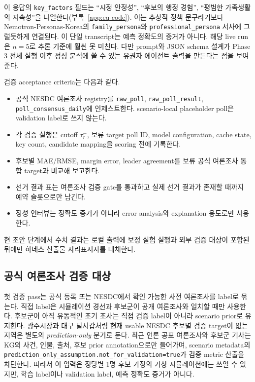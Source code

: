 \documentclass[11pt]{article}
\begin{document}
\noindent 이 응답의 \texttt{key\_factors} 필드는 ``시정 안정성'', ``후보의 행정 경험'', ``평범한 가족생활의 지속성''을 나열한다(부록~\ref{app:eq-code}). 이는 추상적 정책 문구라기보다 Nemotron-Personas-Korea의 \texttt{family\_persona}와 \texttt{professional\_persona} 서사에 그럴듯하게 연결된다. 이 단일 transcript는 예측 정확도의 증거가 아니다. 해당 live run은 $n{=}5$로 추론 기준에 훨씬 못 미친다. 다만 prompt와 JSON schema 설계가 Phase 3 전체 실행 이후 정성 분석에 쓸 수 있는 유권자 에이전트 출력을 만든다는 점을 보여준다.

검증 acceptance criteria는 다음과 같다.

\begin{itemize}
  \item 공식 NESDC 여론조사 registry를 \texttt{raw\_poll}, \texttt{raw\_poll\_result}, \texttt{poll\_consensus\_daily}에 인제스트한다. scenario-local placeholder poll은 validation label로 쓰지 않는다.
  \item 각 검증 실행은 cutoff $\tau_r^-$, 보류 target poll ID, model configuration, cache state, key count, candidate mapping을 scoring 전에 기록한다.
  \item 후보별 MAE/RMSE, margin error, leader agreement를 보류 공식 여론조사 통합 target과 비교해 보고한다.
  \item 선거 결과 표는 여론조사 검증 gate를 통과하고 실제 선거 결과가 존재할 때까지 예약 슬롯으로만 남긴다.
  \item 정성 인터뷰는 정확도 증거가 아니라 error analysis와 explanation 용도로만 사용한다.
\end{itemize}

현 초안 단계에서 수치 결과는 로컬 출력에 보정 실험 실행과 외부 검증 대상이 포함된 뒤에만 하네스 산출물 자리표시자를 대체한다.

\subsection{공식 여론조사 검증 대상}

첫 검증 pass는 공식 등록 또는 NESDC에서 확인 가능한 사전 여론조사를 label로 묶는다. 직접 label은 시뮬레이션 경선과 후보군이 공개 여론조사와 일치할 때만 사용한다. 후보군이 아직 유동적인 초기 조사는 직접 검증 label이 아니라 scenario prior로 유지한다. 광주시장과 대구 달서갑처럼 현재 usable NESDC 후보별 검증 target이 없는 지역은 별도의 \emph{prediction-only} 분기로 둔다. 최근 언론 공표 여론조사와 후보군 기사는 KG의 사건, 인물, 출처, 후보 prior annotation으로만 들어가며, scenario metadata의 \texttt{prediction\_only\_assumption.not\_for\_validation=true}가 검증 metric 산출을 차단한다. 따라서 이 입력은 정당별 1명 후보 가정의 가상 시뮬레이션에는 쓰일 수 있지만, 학습 label이나 validation label, 예측 정확도 증거가 아니다.
\end{document}
